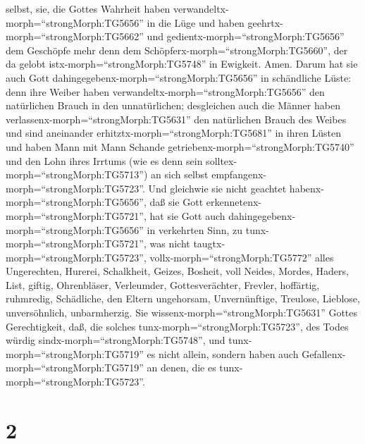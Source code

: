 selbst,  sie, die Gottes Wahrheit haben
verwandeltx-morph=``strongMorph:TG5656'' in die Lüge und haben
geehrtx-morph=``strongMorph:TG5662'' und
gedientx-morph=``strongMorph:TG5656'' dem Geschöpfe mehr denn dem
Schöpferx-morph=``strongMorph:TG5660'', der da gelobt
istx-morph=``strongMorph:TG5748'' in Ewigkeit. Amen.  Darum
hat sie auch Gott dahingegebenx-morph=``strongMorph:TG5656'' in
schändliche Lüste: denn ihre Weiber haben
verwandeltx-morph=``strongMorph:TG5656'' den natürlichen Brauch in den
unnatürlichen;  desgleichen auch die Männer haben
verlassenx-morph=``strongMorph:TG5631'' den natürlichen Brauch des
Weibes und sind aneinander erhitztx-morph=``strongMorph:TG5681'' in
ihren Lüsten und haben Mann mit Mann Schande
getriebenx-morph=``strongMorph:TG5740'' und den Lohn ihres Irrtums (wie
es denn sein solltex-morph=``strongMorph:TG5713'') an sich selbst
empfangenx-morph=``strongMorph:TG5723''.  Und gleichwie sie
nicht geachtet habenx-morph=``strongMorph:TG5656'', daß sie Gott
erkennetenx-morph=``strongMorph:TG5721'', hat sie Gott auch
dahingegebenx-morph=``strongMorph:TG5656'' in verkehrten Sinn, zu
tunx-morph=``strongMorph:TG5721'', was nicht
taugtx-morph=``strongMorph:TG5723'', 
vollx-morph=``strongMorph:TG5772'' alles Ungerechten, Hurerei,
Schalkheit, Geizes, Bosheit, voll Neides, Mordes, Haders, List, giftig,
Ohrenbläser,  Verleumder, Gottesverächter, Frevler,
hoffärtig, ruhmredig, Schädliche, den Eltern ungehorsam, 
Unvernünftige, Treulose, Lieblose, unversöhnlich, unbarmherzig.
 Sie wissenx-morph=``strongMorph:TG5631'' Gottes
Gerechtigkeit, daß, die solches tunx-morph=``strongMorph:TG5723'', des
Todes würdig sindx-morph=``strongMorph:TG5748'', und
tunx-morph=``strongMorph:TG5719'' es nicht allein, sondern haben auch
Gefallenx-morph=``strongMorph:TG5719'' an denen, die es
tunx-morph=``strongMorph:TG5723''.

\hypertarget{section-1}{%
\section{2}\label{section-1}}

